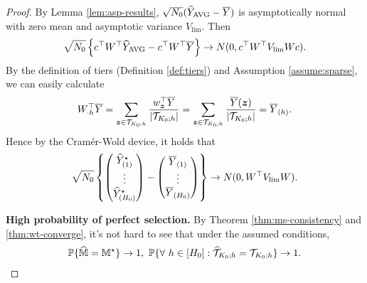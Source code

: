 \documentclass[12pt]{article}
\begin{document}
\begin{proof}
    By Lemma \ref{lem:asp-results}, $\sqrt{N_0}({\widehat{Y}}_{\operatorname{AVG}} - \overline{Y})$ is asymptotically normal with zero mean and asymptotic variance $V_{\lim}$. Then 
    \begin{align*}
        \sqrt{N_0} \left\{c^\top W^\top {\widehat{Y}}_{\operatorname{AVG}} - c^\top W^\top \overline{Y}\right\} \to N(0, c^\top W^\top V_{\lim} W c).
    \end{align*}
    By the definition of tiers (Definition \ref{def:tiers}) and  Assumption \ref{assume:sparse}, we can easily calculate
    \begin{align*}
        W_{\cdot h}^\top \overline{Y} 
        =  \sum_{{\boldsymbol{z}}\in {{\mathcal{T}}}_{K_0;h}}\frac{w^\top_{{\boldsymbol{z}}}\overline{Y}}{|{{\mathcal{T}}}_{K_0;h}|} 
        =  \sum_{{\boldsymbol{z}}\in {{\mathcal{T}}}_{K_0;h}}\frac{\overline{Y}({\boldsymbol{z}})}{|{{\mathcal{T}}}_{K_0;h}|} = \overline{Y}_{(h)}.
    \end{align*}
    Hence by the Cram\'{e}r-Wold device, it holds that
    \begin{align*}
        \sqrt{N_0}\left\{
        \begin{pmatrix}
        {\widehat{Y}}^\star_{(1)}\\
        \vdots \\
        {\widehat{Y}}^\star_{(H_0)}
        \end{pmatrix}
        - 
        \begin{pmatrix}
        \overline{Y}_{(1)}\\
        \vdots \\
        \overline{Y}_{(H_0)}
        \end{pmatrix} 
        \right\} \to N(0, W^\top V_{\lim} W).
    \end{align*}

\textbf{High probability of perfect selection.} By Theorem \ref{thm:ms-consistency} and \ref{thm:wt-converge}, it's not hard to see that under the assumed conditions,
\begin{align*}
    {\mathbb{P}}\{\widehat{{\mathbb{M}}} = {\mathbb{M}}^\star\}\to 1,~  {\mathbb{P}}\{\forall~h \in [H_0]: \widehat{{\mathcal{T}}}_{K_0;h} = {{\mathcal{T}}}_{K_0;h}\} \to 1.
\end{align*}


\end{proof}
\end{document}
